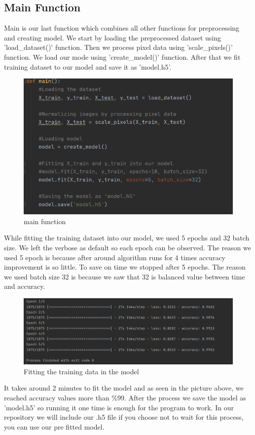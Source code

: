 \documentclass[onecolumn]{article}
\begin{document}
\clearpage
\subsection{Main Function}
Main is our last function which combines all other functions for preprocessing and creating model. We start by loading the preprocessed dataset using 'load\_dataset()' function. Then we process pixel data using 'scale\_pixels()' function. We load our mode using 'create\_model()' function. After that we fit training dataset to our model and save it as 'model.h5'.

\begin{figure}[h!]
\centering
    \includegraphics[width=0.6\linewidth]{main.PNG}
\caption{\label{}
main function}
\end{figure}

While fitting the training dataset into our model, we used 5 epochs and 32 batch size. We left the verbose as default so each epoch can be observed. The reason we used 5 epoch is because after around algorithm runs for 4 times accuracy improvement is so little. To save on time we stopped after 5 epochs. The reason we used batch size 32 is because we saw that 32 is balanced value between time and accuracy.

\begin{figure}[h!]
\centering
    \includegraphics[width=0.7\linewidth]{epoch.PNG}
\caption{\label{}
Fitting the training data in the model}
\end{figure}

It takes around 2 minutes to fit the model and as seen in the picture above, we reached accuracy values more than \%99. After the process we save the model as 'model.h5' so running it one time is enough for the program to work. In our repository we will include our .h5 file if you choose not to wait for this process, you can use our pre fitted model.
\clearpage
\end{document}
